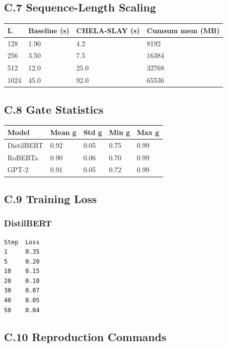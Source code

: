 \subsection{C.7 Sequence-Length Scaling}

\begin{table}[H]
\centering
\small
\begin{tabular}{llll}
\toprule
\textbf{L} & \textbf{Baseline (s)} & \textbf{CHELA-SLAY (s)} & \textbf{Cumsum mem (MB)} \\
\midrule
128 & 1.90 & 4.2 & 8192 \\
256 & 3.50 & 7.5 & 16384 \\
512 & 12.0 & 25.0 & 32768 \\
1024 & 45.0 & 92.0 & 65536 \\
\bottomrule
\end{tabular}
\end{table}

\subsection{C.8 Gate Statistics}

\begin{table}[H]
\centering
\small
\begin{tabular}{lllll}
\toprule
\textbf{Model} & \textbf{Mean g} & \textbf{Std g} & \textbf{Min g} & \textbf{Max g} \\
\midrule
DistilBERT & 0.92 & 0.05 & 0.75 & 0.99 \\
RoBERTa & 0.90 & 0.06 & 0.70 & 0.99 \\
GPT-2 & 0.91 & 0.05 & 0.72 & 0.99 \\
\bottomrule
\end{tabular}
\end{table}

\subsection{C.9 Training Loss}

\subsubsection{DistilBERT}
\begin{lstlisting}
Step  Loss
1     0.35
5     0.20
10    0.15
20    0.10
30    0.07
40    0.05
50    0.04
\end{lstlisting}

\subsection{C.10 Reproduction Commands}


